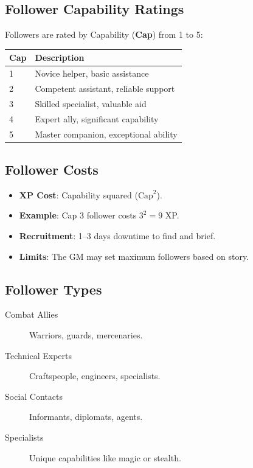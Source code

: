 \subsection*{Follower Capability Ratings}
\label{sec:follower-cap}
Followers are rated by Capability (\textbf{Cap}) from 1 to 5:

\begin{center}
\begin{tabular}{ll}
\toprule
\textbf{Cap} & \textbf{Description} \\
\midrule
1 & Novice helper, basic assistance \\
2 & Competent assistant, reliable support \\
3 & Skilled specialist, valuable aid \\
4 & Expert ally, significant capability \\
5 & Master companion, exceptional ability \\
\bottomrule
\end{tabular}
\end{center}

\subsection*{Follower Costs}
\label{sec:follower-costs}
\begin{itemize}
\item \textbf{XP Cost}: Capability squared ($\text{Cap}^2$).
\item \textbf{Example}: Cap 3 follower costs $3^2 = 9$ XP.
\item \textbf{Recruitment}: 1--3 days downtime to find and brief.
\item \textbf{Limits}: The GM may set maximum followers based on story.
\end{itemize}

\subsection*{Follower Types}
\label{sec:follower-types}
\begin{description}
\item[Combat Allies] Warriors, guards, mercenaries.
\item[Technical Experts] Craftspeople, engineers, specialists.
\item[Social Contacts] Informants, diplomats, agents.
\item[Specialists] Unique capabilities like magic or stealth.
\end{description}

